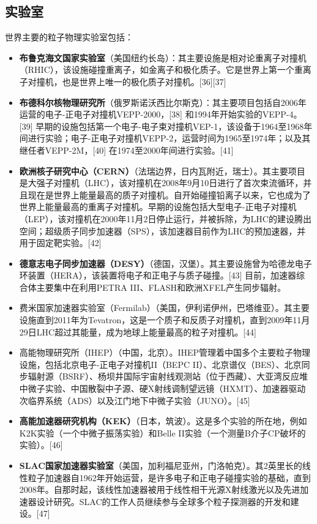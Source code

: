 \subsection{实验室}
世界主要的粒子物理实验室包括：
\begin{itemize}
\item \textbf{布鲁克海文国家实验室}（美国纽约长岛）：其主要设施是相对论重离子对撞机（RHIC），该设施碰撞重离子，如金离子和极化质子。它是世界上第一个重离子对撞机，也是世界上唯一的极化质子对撞机。[36][37]
\item \textbf{布德科尔核物理研究所}（俄罗斯诺沃西比尔斯克）：其主要项目包括自2006年运营的电子-正电子对撞机VEPP-2000，[38] 和1994年开始实验的VEPP-4。[39] 早期的设施包括第一个电子-电子束对撞机VEP-1，该设备于1964至1968年间进行实验；电子-正电子对撞机VEPP-2，运营时间为1965至1974年；以及其继任者VEPP-2M，[40] 在1974至2000年间进行实验。[41]
\item \textbf{欧洲核子研究中心（CERN）}（法瑞边界，日内瓦附近，瑞士）。其主要项目是大强子对撞机（LHC），该对撞机在2008年9月10日进行了首次束流循环，并且现在是世界上能量最高的质子对撞机。自开始碰撞铅离子以来，它也成为了世界上能量最高的重离子对撞机。早期的设施包括大型电子-正电子对撞机（LEP），该对撞机在2000年11月2日停止运行，并被拆除，为LHC的建设腾出空间；超级质子同步加速器（SPS），该加速器目前作为LHC的预加速器，并用于固定靶实验。[42]
\item \textbf{德意志电子同步加速器（DESY）}（德国，汉堡）。其主要设施曾为哈德龙电子环装置（HERA），该装置将电子和正电子与质子碰撞。[43] 目前，加速器综合体主要集中在利用PETRA III、FLASH和欧洲XFEL产生同步辐射。
\item 费米国家加速器实验室（Fermilab）（美国，伊利诺伊州，巴塔维亚）。其主要设施直到2011年为Tevatron，这是一个质子和反质子对撞机，直到2009年11月29日LHC超过其能量，成为地球上能量最高的粒子对撞机。[44]
\item 高能物理研究所（IHEP）（中国，北京）。IHEP管理着中国多个主要粒子物理设施，包括北京电子-正电子对撞机II（BEPC II）、北京谱仪（BES）、北京同步辐射源（BSRF）、杨坝井国际宇宙射线观测站（位于西藏）、大亚湾反应堆中微子实验、中国散裂中子源、硬X射线调制望远镜（HXMT）、加速器驱动次临界系统（ADS）以及江门地下中微子实验（JUNO）。[45]
\item \textbf{高能加速器研究机构（KEK）}（日本，筑波）。这是多个实验的所在地，例如K2K实验（一个中微子振荡实验）和Belle II实验（一个测量B介子CP破坏的实验）。[46]
\item \textbf{SLAC国家加速器实验室}（美国，加利福尼亚州，门洛帕克）。其2英里长的线性粒子加速器自1962年开始运营，是许多电子和正电子碰撞实验的基础，直到2008年。自那时起，该线性加速器被用于线性相干光源X射线激光以及先进加速器设计研究。SLAC的工作人员继续参与全球多个粒子探测器的开发和建设。[47]
\end{itemize}
